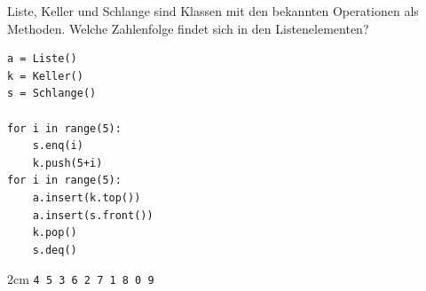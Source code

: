 \question[2]
Liste, Keller und Schlange sind Klassen mit den bekannten Operationen als Methoden.
Welche Zahlenfolge findet sich in den Listenelementen?
 
\begin{lstlisting}
a = Liste()
k = Keller()
s = Schlange()

for i in range(5):
    s.enq(i)
    k.push(5+i)
for i in range(5):
    a.insert(k.top())
    a.insert(s.front())
    k.pop()
    s.deq()
\end{lstlisting}

\begin{solutionbox}{2cm}
\texttt{4 5 3 6 2 7 1 8 0 9}  
\end{solutionbox}
